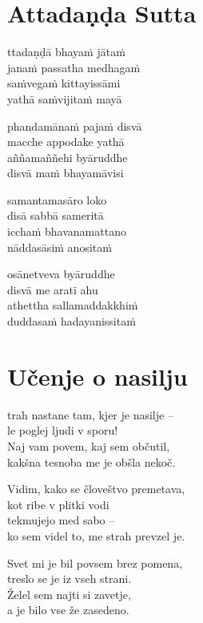 

\cleartoverso
\chapter*{Attadaṇḍa Sutta}

ttadaṇḍā bhayaṁ jātaṁ\\
janaṁ passatha medhagaṁ\\
saṁvegaṁ kittayissāmi\\
yathā saṁvijitaṁ mayā

phandamānaṁ pajaṁ disvā\\
macche appodake yathā\\
aññamaññehi byāruddhe\\
disvā maṁ bhayamāvisi

samantamasāro loko\\
disā sabbā sameritā\\
icchaṁ bhavanamattano\\
nāddasāsiṁ anositaṁ

osānetveva byāruddhe\\
disvā me aratī ahu\\
athettha sallamaddakkhiṁ\\
duddasaṁ hadayanissitaṁ


\cleartorecto
\chapter{Učenje o nasilju}

trah nastane tam, kjer je nasilje --\\
le poglej ljudi v sporu!\\
Naj vam povem, kaj sem občutil,\\
kakšna tesnoba me je obšla nekoč.

Vidim, kako se človeštvo premetava,\\
kot ribe v plitki vodi\\
tekmujejo med sabo --\\
ko sem videl to, me strah prevzel je.

Svet mi je bil povsem brez pomena,\\
treslo se je iz vseh strani.\\
Želel sem najti si zavetje,\\
a je bilo vse že zasedeno.

